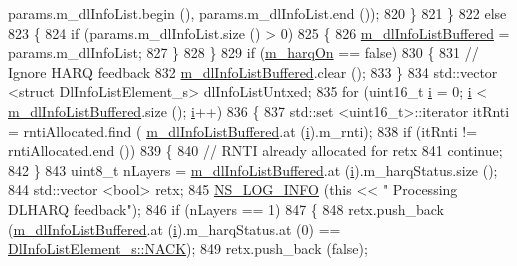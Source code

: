 \begin{DoxyCode}
       params.m\_dlInfoList.begin (), params.m\_dlInfoList.end ());
820         \}
821     \}
822   \textcolor{keywordflow}{else}
823     \{
824       \textcolor{keywordflow}{if} (params.m\_dlInfoList.size () > 0)
825         \{
826           \hyperlink{classns3_1_1PfFfMacScheduler_af3c266623addc28fc6ecd97901183a2f}{m\_dlInfoListBuffered} = params.m\_dlInfoList;
827         \}
828     \}
829   \textcolor{keywordflow}{if} (\hyperlink{classns3_1_1PfFfMacScheduler_a20ee9882187d440870b2a88b63fcb7e9}{m\_harqOn} == \textcolor{keyword}{false})
830     \{
831       \textcolor{comment}{// Ignore HARQ feedback}
832       \hyperlink{classns3_1_1PfFfMacScheduler_af3c266623addc28fc6ecd97901183a2f}{m\_dlInfoListBuffered}.clear ();
833     \}
834   std::vector <struct DlInfoListElement\_s> dlInfoListUntxed;
835   \textcolor{keywordflow}{for} (uint16\_t \hyperlink{bernuolliDistribution_8m_a6f6ccfcf58b31cb6412107d9d5281426}{i} = 0; \hyperlink{bernuolliDistribution_8m_a6f6ccfcf58b31cb6412107d9d5281426}{i} < \hyperlink{classns3_1_1PfFfMacScheduler_af3c266623addc28fc6ecd97901183a2f}{m\_dlInfoListBuffered}.size (); \hyperlink{bernuolliDistribution_8m_a6f6ccfcf58b31cb6412107d9d5281426}{i}++)
836     \{
837       std::set <uint16\_t>::iterator itRnti = rntiAllocated.find (
      \hyperlink{classns3_1_1PfFfMacScheduler_af3c266623addc28fc6ecd97901183a2f}{m\_dlInfoListBuffered}.at (\hyperlink{bernuolliDistribution_8m_a6f6ccfcf58b31cb6412107d9d5281426}{i}).m\_rnti);
838       \textcolor{keywordflow}{if} (itRnti != rntiAllocated.end ())
839         \{
840           \textcolor{comment}{// RNTI already allocated for retx}
841           \textcolor{keywordflow}{continue};
842         \}
843       uint8\_t nLayers = \hyperlink{classns3_1_1PfFfMacScheduler_af3c266623addc28fc6ecd97901183a2f}{m\_dlInfoListBuffered}.at (\hyperlink{bernuolliDistribution_8m_a6f6ccfcf58b31cb6412107d9d5281426}{i}).m\_harqStatus.size ();
844       std::vector <bool> retx;
845       \hyperlink{group__logging_gafbd73ee2cf9f26b319f49086d8e860fb}{NS\_LOG\_INFO} (\textcolor{keyword}{this} << \textcolor{stringliteral}{" Processing DLHARQ feedback"});
846       \textcolor{keywordflow}{if} (nLayers == 1)
847         \{
848           retx.push\_back (\hyperlink{classns3_1_1PfFfMacScheduler_af3c266623addc28fc6ecd97901183a2f}{m\_dlInfoListBuffered}.at (\hyperlink{bernuolliDistribution_8m_a6f6ccfcf58b31cb6412107d9d5281426}{i}).m\_harqStatus.at (0) == 
      \hyperlink{structns3_1_1DlInfoListElement__s_a3e55b89f756b7bd8909c8116a202a17aaf90e76e67c86729b4ee21927b7fb1770}{DlInfoListElement\_s::NACK});
849           retx.push\_back (\textcolor{keyword}{false});

\end{DoxyCode}
